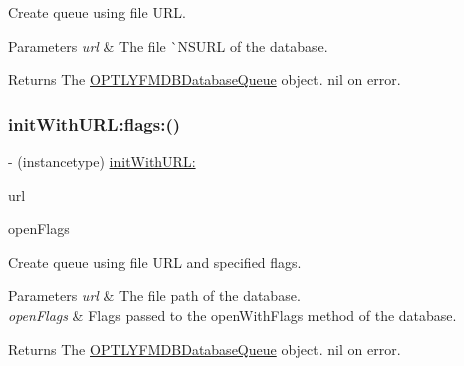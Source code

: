 Create queue using file U\+RL.


\begin{DoxyParams}{Parameters}
{\em url} & The file \`{}\+N\+S\+U\+RL of the database.\\
\hline
\end{DoxyParams}
\begin{DoxyReturn}{Returns}
The {\ttfamily \mbox{\hyperlink{interface_o_p_t_l_y_f_m_d_b_database_queue}{O\+P\+T\+L\+Y\+F\+M\+D\+B\+Database\+Queue}}} object. {\ttfamily nil} on error. 
\end{DoxyReturn}
\mbox{\label{interface_o_p_t_l_y_f_m_d_b_database_queue_a4136c9e6ec92245fee3c768a370e670f}} 
\subsubsection{\texorpdfstring{init\+With\+U\+R\+L\+:flags\+:()}{initWithURL:flags:()}}
{\footnotesize\ttfamily -\/ (instancetype) \mbox{\hyperlink{interface_o_p_t_l_y_f_m_d_b_database_queue_a554f6477a5ed4fe69ae83bb2200edb48}{init\+With\+U\+R\+L\+:}} \begin{DoxyParamCaption}\item[{(N\+S\+U\+RL $\ast$\+\_\+\+Nullable)}]{url }\item[{flags:(int)}]{open\+Flags }\end{DoxyParamCaption}}

Create queue using file U\+RL and specified flags.


\begin{DoxyParams}{Parameters}
{\em url} & The file path of the database. \\
\hline
{\em open\+Flags} & Flags passed to the open\+With\+Flags method of the database.\\
\hline
\end{DoxyParams}
\begin{DoxyReturn}{Returns}
The {\ttfamily \mbox{\hyperlink{interface_o_p_t_l_y_f_m_d_b_database_queue}{O\+P\+T\+L\+Y\+F\+M\+D\+B\+Database\+Queue}}} object. {\ttfamily nil} on error. 
\end{DoxyReturn}
\mbox{\label{interface_o_p_t_l_y_f_m_d_b_database_queue_ae2e52eded98d3648fb6251de8404c9f8}} 
